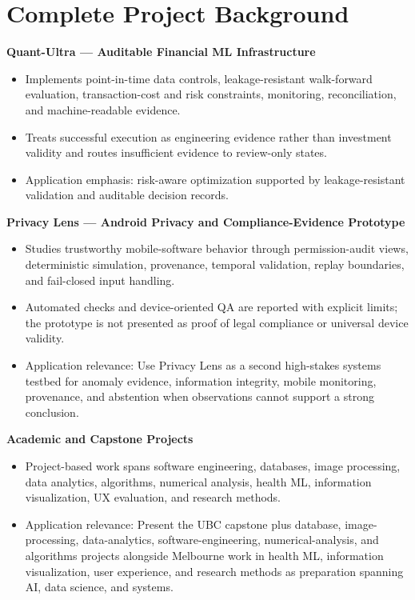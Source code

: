 \documentclass[11pt]{article}
\begin{document}
\section*{Complete Project Background}
\textbf{Quant-Ultra --- Auditable Financial ML Infrastructure}
\begin{itemize}
\item Implements point-in-time data controls, leakage-resistant walk-forward evaluation, transaction-cost and risk constraints, monitoring, reconciliation, and machine-readable evidence.
\item Treats successful execution as engineering evidence rather than investment validity and routes insufficient evidence to review-only states.
\item Application emphasis: risk-aware optimization supported by leakage-resistant validation and auditable decision records.
\end{itemize}

\textbf{Privacy Lens --- Android Privacy and Compliance-Evidence Prototype}
\begin{itemize}
\item Studies trustworthy mobile-software behavior through permission-audit views, deterministic simulation, provenance, temporal validation, replay boundaries, and fail-closed input handling.
\item Automated checks and device-oriented QA are reported with explicit limits; the prototype is not presented as proof of legal compliance or universal device validity.
\item Application relevance: Use Privacy Lens as a second high-stakes systems testbed for anomaly evidence, information integrity, mobile monitoring, provenance, and abstention when observations cannot support a strong conclusion.
\end{itemize}

\textbf{Academic and Capstone Projects}
\begin{itemize}
\item Project-based work spans software engineering, databases, image processing, data analytics, algorithms, numerical analysis, health ML, information visualization, UX evaluation, and research methods.
\item Application relevance: Present the UBC capstone plus database, image-processing, data-analytics, software-engineering, numerical-analysis, and algorithms projects alongside Melbourne work in health ML, information visualization, user experience, and research methods as preparation spanning AI, data science, and systems.
\end{itemize}
\end{document}
